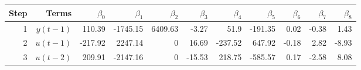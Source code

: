\begin{tabular}{rrrrrrrrrrr}
Step & Terms & $\beta_{0}$ & $\beta_{1}$ & $\beta_{2}$ & $\beta_{3}$ & $\beta_{4}$ & $\beta_{5}$ & $\beta_{6}$ & $\beta_{7}$ & $\beta_{8}$ \\ 
\hline 
1 & $y(t-1)$ & 110.39 & -1745.15 & 6409.63 & -3.27 & 51.9 & -191.35 & 0.02 & -0.38 & 1.43 \\ 
2 & $u(t-1)$ & -217.92 & 2247.14 & 0 & 16.69 & -237.52 & 647.92 & -0.18 & 2.82 & -8.93 \\ 
3 & $u(t-2)$ & 209.91 & -2147.16 & 0 & -15.53 & 218.75 & -585.57 & 0.17 & -2.58 & 8.08 \\ 
\hline 
\end{tabular}